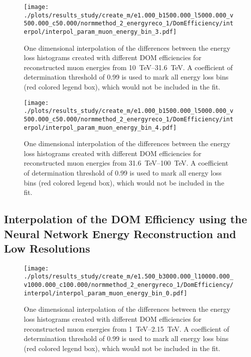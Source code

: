 \begin{figure}[H]
    \centering
    \texttt{[image: ./plots/results\_study/create\_m/e1.000\_b1500.000\_l5000.000\_v500.000\_c50.000/normmethod\_2\_energyreco\_1/DomEfficiency/interpol/interpol\_param\_muon\_energy\_bin\_3.pdf]}
    \caption{One dimensional interpolation of the differences between the energy loss histograms created with different DOM efficiencies for reconstructed muon energies from \SIrange{10}{31.6}{TeV}. A coefficient of determination threshold of \num{0.99} is used to mark all energy loss bins (red colored legend box), which would not be included in the fit.}
    \label{fig:study_1d_interpol_mu3_nn_base_eff}
\end{figure}

\begin{figure}[H]
    \centering
    \texttt{[image: ./plots/results\_study/create\_m/e1.000\_b1500.000\_l5000.000\_v500.000\_c50.000/normmethod\_2\_energyreco\_1/DomEfficiency/interpol/interpol\_param\_muon\_energy\_bin\_4.pdf]}
    \caption{One dimensional interpolation of the differences between the energy loss histograms created with different DOM efficiencies for reconstructed muon energies from \SIrange{31.6}{100}{TeV}. A coefficient of determination threshold of \num{0.99} is used to mark all energy loss bins (red colored legend box), which would not be included in the fit.}
    \label{fig:study_1d_interpol_mu4_nn_base_eff}
\end{figure}

%

\subsection*{Interpolation of the DOM Efficiency using the Neural Network Energy Reconstruction and Low Resolutions}

\begin{figure}[H]
    \centering
    \texttt{[image: ./plots/results\_study/create\_m/e1.500\_b3000.000\_l10000.000\_v1000.000\_c100.000/normmethod\_2\_energyreco\_1/DomEfficiency/interpol/interpol\_param\_muon\_energy\_bin\_0.pdf]}
    \caption{One dimensional interpolation of the differences between the energy loss histograms created with different DOM efficiencies for reconstructed muon energies from \SIrange{1}{2.15}{TeV}. A coefficient of determination threshold of \num{0.99} is used to mark all energy loss bins (red colored legend box), which would not be included in the fit.}
    \label{fig:study_1d_interpol_mu0_nn_low_eff}
\end{figure}

